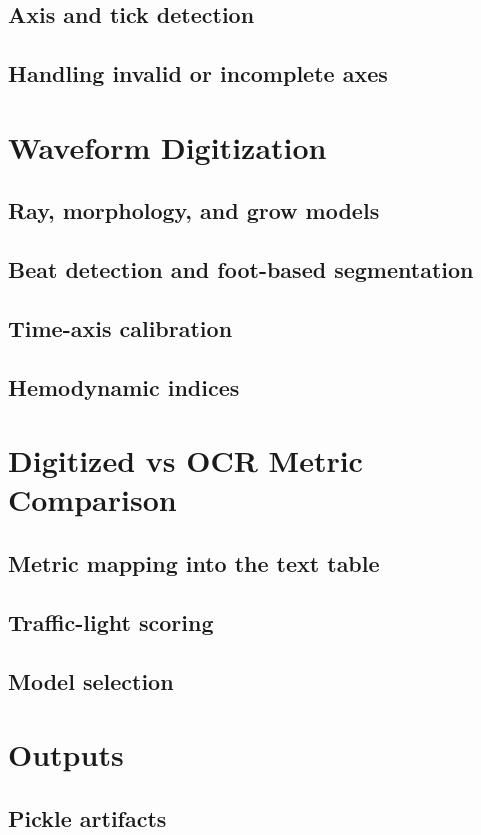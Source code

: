 \documentclass[11pt,a4paper]{article}
\begin{document}
  \subsection{Axis and tick detection}
  \subsection{Handling invalid or incomplete axes}

\section{Waveform Digitization}
  \subsection{Ray, morphology, and grow models}
  \subsection{Beat detection and foot-based segmentation}
  \subsection{Time-axis calibration}
  \subsection{Hemodynamic indices}

\section{Digitized vs OCR Metric Comparison}
  \subsection{Metric mapping into the text table}
  \subsection{Traffic-light scoring}
  \subsection{Model selection}

\section{Outputs}
  \subsection{Pickle artifacts}
\end{document}
